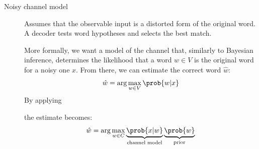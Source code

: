 \begin{description}
    \item[Noisy channel model] 
        Assumes that the observable input is a distorted form of the original word. A decoder tests word hypotheses and selects the best match. 

        \begin{minipage}{0.7\linewidth}
            More formally, we want a model of the channel that, similarly to Bayesian inference, determines the likelihood that a word $w \in V$ is the original word for a noisy one $x$. From there, we can estimate the correct word $\hat{w}$:
            \[ \hat{w} = \arg\max_{w \in V} \prob{w | x} \]
            By applying 
            the estimate becomes:
            \[ \hat{w} = \arg\max_{w \in C} \underbrace{\prob{x|w}}_{\text{channel model}} \underbrace{\prob{w}}_{\text{prior}} \]


\end{minipage}
\end{description}
